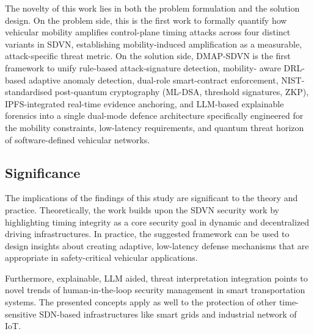 The novelty of this work lies in both the problem formulation and
the solution design. On the problem side, this is the first work to
formally quantify how vehicular mobility amplifies control-plane
timing attacks across four distinct variants in SDVN, establishing
mobility-induced amplification as a measurable, attack-specific
threat metric. On the solution side, DMAP-SDVN is the first
framework to unify rule-based attack-signature detection, mobility-
aware DRL-based adaptive anomaly detection, dual-role smart-contract
enforcement, NIST-standardised post-quantum cryptography (ML-DSA,
threshold signatures, ZKP), IPFS-integrated real-time evidence
anchoring, and LLM-based explainable forensics into a single
dual-mode defence architecture specifically engineered for the
mobility constraints, low-latency requirements, and quantum threat
horizon of software-defined vehicular networks.

\subsection{Significance}

The implications of the findings of this study are significant to the theory and practice. Theoretically, the work builds upon the SDVN security work by highlighting timing integrity as a core security goal in dynamic and decentralized driving infrastructures. In practice, the suggested framework can be used to design insights about creating adaptive, low-latency defense mechanisms that are appropriate in safety-critical vehicular applications.

Furthermore, explainable, LLM aided, threat interpretation integration points to novel trends of human-in-the-loop security management in smart transportation systems. The presented concepts apply as well to the protection of other time-sensitive SDN-based infrastructures like smart grids and industrial network of IoT.